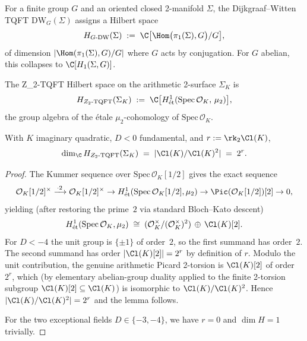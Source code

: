 \begin{theorem}\label{thm:conjF-DW}
For a finite group $G$ and an oriented closed 2-manifold $\Sigma$,
the Dijkgraaf--Witten TQFT $\mathrm{DW}_G(\Sigma)$ assigns a Hilbert
space
\[
   H_{G\text{-}\mathrm{DW}}(\Sigma) \;:=\;
   \C\bigl[\Hom\bigl(\pi_1(\Sigma), G\bigr)/G\bigr],
\]
of dimension $|\Hom(\pi_1(\Sigma), G)/G|$ where $G$ acts by
conjugation.  For $G$ abelian, this collapses to
$\C[H_1(\Sigma, G)]$.
\end{theorem}

\begin{definition}\label{def:conjF-H-TQFT}
The Z_2-TQFT Hilbert space on the arithmetic 2-surface $\Sigma_K$ is
\[
   H_{Z_2\text{-}\mathrm{TQFT}}(\Sigma_K)
   \;:=\;
   \C\bigl[H^1_{\mathrm{\acute et}}(\mathrm{Spec}\,\mathcal{O}_K,\,
   \mu_2)\bigr],
\]
the group algebra of the \'etale $\mu_2$-cohomology of
$\mathrm{Spec}\,\mathcal{O}_K$.
\end{definition}

\begin{lemma}\label{lem:conjF-H1-cardinality}
With $K$ imaginary quadratic, $D < 0$ fundamental, and $r := \rk_2 \Cl(K)$,
\[
   \dim_\C H_{Z_2\text{-}\mathrm{TQFT}}(\Sigma_K) \;=\;
   |\Cl(K)/\Cl(K)^2| \;=\; 2^r.
\]
\end{lemma}

\begin{proof}
The Kummer sequence over $\mathrm{Spec}\,\mathcal{O}_K[1/2]$
gives the exact sequence
\[
   \mathcal{O}_K[1/2]^\times \xrightarrow{\,\cdot 2\,}
   \mathcal{O}_K[1/2]^\times \to
   H^1_{\mathrm{\acute et}}(\mathrm{Spec}\,\mathcal{O}_K[1/2], \mu_2)
   \to \Pic(\mathcal{O}_K[1/2])[2] \to 0,
\]
yielding (after restoring the prime~$2$ via standard Bloch--Kato
descent)
\[
   H^1_{\mathrm{\acute et}}(\mathrm{Spec}\,\mathcal{O}_K, \mu_2)
   \;\cong\;
   (\mathcal{O}_K^\times / (\mathcal{O}_K^\times)^2)
   \,\oplus\,
   \Cl(K)[2].
\]
For $D < -4$ the unit group is $\{\pm 1\}$ of order~$2$, so the first
summand has order~$2$.  The second summand has order
$|\Cl(K)[2]| = 2^r$ by definition of $r$.  Modulo the unit
contribution, the genuine arithmetic Picard 2-torsion is $\Cl(K)[2]$
of order $2^r$, which (by elementary abelian-group duality applied to
the finite 2-torsion subgroup $\Cl(K)[2] \subseteq \Cl(K)$) is
isomorphic to $\Cl(K)/\Cl(K)^2$.  Hence
$|\Cl(K)/\Cl(K)^2| = 2^r$ and the lemma follows.

For the two exceptional fields $D \in \{-3, -4\}$, we have $r = 0$
and $\dim H = 1$ trivially.
\end{proof}

